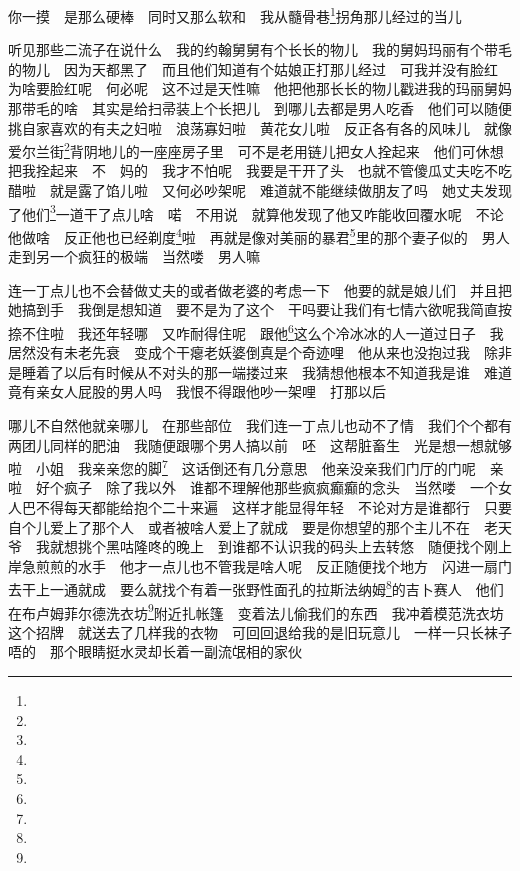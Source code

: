 \par 你一摸　是那么硬棒　同时又那么软和　我从髓骨巷\footnote{}拐角那儿经过的当儿　
\par 听见那些二流子在说什么　我的约翰舅舅有个长长的物儿　我的舅妈玛丽有个带毛的物儿　因为天都黑了　而且他们知道有个姑娘正打那儿经过　可我并没有脸红　为啥要脸红呢　何必呢　这不过是天性嘛　他把他那长长的物儿戳进我的玛丽舅妈那带毛的啥　其实是给扫帚装上个长把儿　到哪儿去都是男人吃香　他们可以随便挑自家喜欢的有夫之妇啦　浪荡寡妇啦　黄花女儿啦　反正各有各的风味儿　就像爱尔兰街\footnote{}背阴地儿的一座座房子里　可不是老用链儿把女人拴起来　他们可休想把我拴起来　不　妈的　我才不怕呢　我要是干开了头　也就不管傻瓜丈夫吃不吃醋啦　就是露了馅儿啦　又何必吵架呢　难道就不能继续做朋友了吗　她丈夫发现了他们\footnote{}一道干了点儿啥　喏　不用说　就算他发现了他又咋能收回覆水呢　不论他做啥　反正他也已经剃度\footnote{}啦　再就是像对美丽的暴君\footnote{}里的那个妻子似的　男人走到另一个疯狂的极端　当然喽　男人嘛　
\par 连一丁点儿也不会替做丈夫的或者做老婆的考虑一下　他要的就是娘儿们　并且把她搞到手　我倒是想知道　要不是为了这个　干吗要让我们有七情六欲呢我简直按捺不住啦　我还年轻哪　又咋耐得住呢　跟他\footnote{}这么个冷冰冰的人一道过日子　我居然没有未老先衰　变成个干瘪老妖婆倒真是个奇迹哩　他从来也没抱过我　除非是睡着了以后有时候从不对头的那一端搂过来　我猜想他根本不知道我是谁　难道竟有亲女人屁股的男人吗　我恨不得跟他吵一架哩　打那以后　
\par 哪儿不自然他就亲哪儿　在那些部位　我们连一丁点儿也动不了情　我们个个都有两团儿同样的肥油　我随便跟哪个男人搞以前　呸　这帮脏畜生　光是想一想就够啦　小姐　我亲亲您的脚\footnote{}　这话倒还有几分意思　他亲没亲我们门厅的门呢　亲啦　好个疯子　除了我以外　谁都不理解他那些疯疯癫癫的念头　当然喽　一个女人巴不得每天都能给抱个二十来遍　这样才能显得年轻　不论对方是谁都行　只要自个儿爱上了那个人　或者被啥人爱上了就成　要是你想望的那个主儿不在　老天爷　我就想挑个黑咕隆咚的晚上　到谁都不认识我的码头上去转悠　随便找个刚上岸急煎煎的水手　他才一点儿也不管我是啥人呢　反正随便找个地方　闪进一扇门去干上一通就成　要么就找个有着一张野性面孔的拉斯法纳姆\footnote{}的吉卜赛人　他们在布卢姆菲尔德洗衣坊\footnote{}附近扎帐篷　变着法儿偷我们的东西　我冲着模范洗衣坊这个招牌　就送去了几样我的衣物　可回回退给我的是旧玩意儿　一样一只长袜子唔的　那个眼睛挺水灵却长着一副流氓相的家伙　
